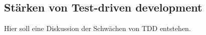 \subsection{Stärken von Test-driven development}\label{diskussion:staerken}

Hier soll eine Diskussion der Schwächen von TDD entstehen.
